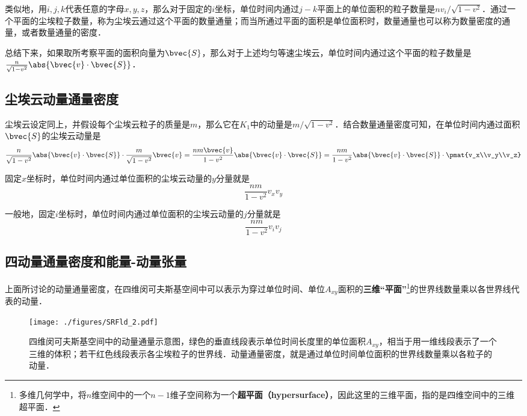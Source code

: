 类似地，用$i, j, k$代表任意的字母$x, y, z$，那么对于固定的$i$坐标，单位时间内通过$j-k$平面上的单位面积的粒子数量是$nv_i/\sqrt{1-v^2}$．通过一个平面的尘埃粒子数量，称为尘埃云通过这个平面的数量通量；而当所通过平面的面积是单位面积时，数量通量也可以称为数量密度的通量，或者数量通量的密度．

总结下来，如果取所考察平面的面积向量为$\bvec{S}$，那么对于上述均匀等速尘埃云，单位时间内通过这个平面的粒子数量是$\frac{n}{\sqrt{1-v^2}}\abs{\bvec{v}\cdot\bvec{S}}$．

\subsection{尘埃云动量通量密度}

尘埃云设定同上，并假设每个尘埃云粒子的质量是$m$，那么它在$K_1$中的动量是$m/\sqrt{1-v^2}$．结合数量通量密度可知，在单位时间内通过面积$\bvec{S}$的尘埃云动量是
\begin{equation}
\frac{n}{\sqrt{1-v^2}}\abs{\bvec{v}\cdot\bvec{S}}\cdot\frac{m}{\sqrt{1-v^2}}\bvec{v}=\frac{nm\bvec{v}}{1-v^2}\abs{\bvec{v}\cdot\bvec{S}}=\frac{nm}{1-v^2}\abs{\bvec{v}\cdot\bvec{S}}\cdot\pmat{v_x\\v_y\\v_z}
\end{equation}

固定$x$坐标时，单位时间内通过单位面积的尘埃云动量的$y$分量就是
\begin{equation}
\frac{nm}{1-v^2}v_xv_y
\end{equation}

一般地，固定$i$坐标时，单位时间内通过单位面积的尘埃云动量的$j$分量就是
\begin{equation}\label{SRFld_eq1}
\frac{nm}{1-v^2}v_iv_j
\end{equation}

\subsection{四动量通量密度和能量-动量张量}

上面所讨论的动量通量密度，在四维闵可夫斯基空间中可以表示为穿过单位时间、单位$A_{xy}$面积的\textbf{三维“平面”}\footnote{多维几何学中，将$n$维空间中的一个$n-1$维子空间称为一个\textbf{超平面（hypersurface）}，因此这里的三维平面，指的是四维空间中的三维超平面．}的世界线数量乘以各世界线代表的动量．

\begin{figure}[ht]
\centering
\texttt{[image: ./figures/SRFld\_2.pdf]}
\caption{四维闵可夫斯基空间中的动量通量示意图，绿色的垂直线段表示单位时间长度里的单位面积$A_{xy}$，相当于用一维线段表示了一个三维的体积；若干红色线段表示各尘埃粒子的世界线．动量通量密度，就是通过单位时间单位面积的世界线数量乘以各粒子的动量．} \label{SRFld_fig2}
\end{figure}

